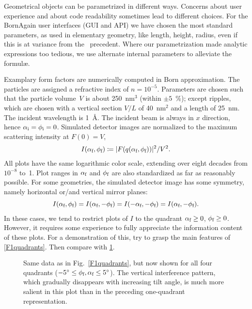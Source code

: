 Geometrical objects can be parametrized in different ways.
Concerns about user experience and about code readability
sometimes lead to different choices.
For the BornAgain user interfaces (GUI and API)
we have chosen the most standard parameters,
as used in elementary geometry, like length, height, radius,
even if this is at variance from the \IsGISAXS\ precedent.
Where our parametrization made analytic expressions too tedious,
we use alternate internal parameters to alleviate the formul\ae.

Examplary form factors are numerically computed in Born approximation.
The particles are assigned a refractive index of $n=10^{-5}$.
%
Parameters are chosen such that
the particle volume~$V$
%
is about 250~nm$^3$ (within $\pm5$~\%);
except ripples, which are chosen with a vertical section $V/L$ of 40~nm$^2$
and a length of 25~nm.
The incident wavelength is 1~\AA.
The incident beam is always in $x$ direction, hence $\alpha_\si=\phi_\si=0$.
Simulated detector images are normalized to the maximum scattering intensity at $F(0)=V$,
\begin{equation}
  I(\alpha_\sf,\phi_\sf)\coloneqq |F(q(\alpha_\sf,\phi_\sf))|^2/V^2.
\end{equation}
All plots
%
have the same logarithmic color scale,
extending over eight decades from $10^{-8}$ to~1.
Plot ranges in $\alpha_\sf$ and $\phi_\sf$ are also standardized as far as
reasonably possible.
For some geometries,
the simulated detector image has some symmetry,
namely horizontal or/and vertical mirror planes:
\begin{equation}\label{EFq4sym}
  I(\alpha_\sf,\phi_\sf)
  = I(\alpha_\sf,-\phi_\sf)
  = I(-\alpha_\sf,-\phi_\sf)
  = I(\alpha_\sf,-\phi_\sf).
\end{equation}
In these cases, we tend to restrict
plots of $I$ to the quadrant $\alpha_\sf\ge0$, $\phi_\sf\ge0$.
However, it requires some experience to fully appreciate the
information content of these plots.
For a demonstration of this,
try to grasp the main features of \cref{F1quadrants}.
Then compare with \cref{F4quadrants}.

\begin{figure}[t]
\begin{center}
\end{center}
\caption{Same data as in Fig.~\protect\ref{F1quadrants},
but now shown for all four quadrants ($-5^\circ\le\phi_\sf,\alpha_\sf\le 5^\circ$).
The vertical interference pattern,
which gradually disappears with increasing tilt angle,
 is much more salient in this plot
than in the preceding one-quadrant representation.}
\label{F4quadrants}
\end{figure}

